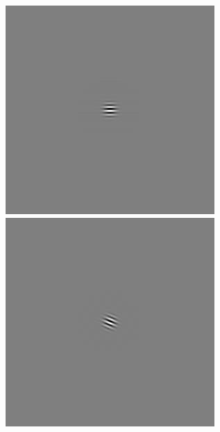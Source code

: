 \begin{figure}[ht]
\begin{center}
 \includegraphics[width=\columnwidth/9]{ch4/figures/iGabor0_4.jpg}
 \includegraphics[width=\columnwidth/9]{ch4/figures/iGabor0_5.jpg}

\end{center}
\end{figure}
